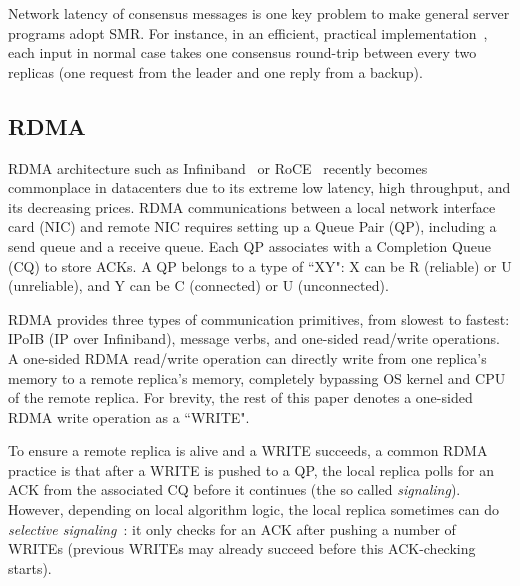 Network latency of consensus messages is one key problem to make general server 
programs adopt SMR. For instance, in an efficient, practical 
\paxos implementation~\cite{paxos:practical}, each input in normal case takes 
one consensus round-trip between every two replicas (one request from the leader 
and one reply from a backup).


\subsection{RDMA}\label{sec:rdma}
RDMA architecture such as Infiniband~\cite{infiniband} or RoCE~\cite{roce} 
recently becomes commonplace in datacenters due to its extreme low latency, 
high throughput, and its decreasing prices. RDMA communications between a local 
network interface card (NIC) and remote NIC requires setting up a Queue Pair 
(QP), including a send queue and a receive queue. Each QP associates with a 
Completion Queue (CQ) to store ACKs. A QP belongs to a type of ``XY": X can be R 
(reliable) or U (unreliable), and Y can be C (connected) or U (unconnected). 


RDMA provides three types of communication primitives, from slowest to 
fastest: IPoIB (IP over Infiniband), message verbs, and one-sided read/write 
operations. A one-sided RDMA read/write operation can directly write from one 
replica's memory to a 
remote replica's memory, completely bypassing OS kernel and CPU of the remote 
replica. For brevity, the rest of this paper denotes a one-sided RDMA write 
operation as a ``WRITE".

To ensure a remote replica is alive and a WRITE succeeds, a common RDMA 
practice is that after a WRITE is pushed to a QP, the local replica polls
for an ACK from the associated CQ before it continues (the so called 
\emph{signaling}). However, depending on local algorithm logic, the local 
replica sometimes can do \emph{selective signaling}~\cite{herd:sigcomm14}: it 
only checks for an ACK after pushing a number of WRITEs (previous WRITEs may 
already succeed before this ACK-checking starts).

